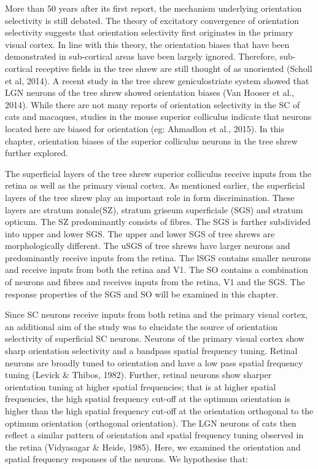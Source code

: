 \documentclass [12pt]{report}
\begin{document}
More than 50 years after its first report, the mechanism underlying orientation selectivity is still debated. The theory of excitatory convergence of orientation selectivity suggests that orientation selectivity first originates in the primary visual cortex. In line with this theory, the orientation biases that have been demonstrated in sub-cortical areas have been largely ignored. Therefore, sub-cortical receptive fields in the tree shrew are still thought of as unoriented (Scholl et al, 2014). A recent study in the tree shrew geniculostriate system showed that LGN neurons of the tree shrew showed orientation biases (Van Hooser et al., 2014). While there are not many reports of orientation selectivity in the SC of cats and macaques, studies in the mouse superior colliculus indicate that neurons located here are biased for orientation (eg: Ahmadlou et al., 2015). In this chapter, orientation biases of the superior colliculus neurons in the tree shrew further explored.

The superficial layers of the tree shrew superior colliculus receive inputs from the retina as well as the primary visual cortex. As mentioned earlier, the superficial layers of the tree shrew play an important role in form discrimination. These layers are stratum zonale(SZ), stratum griseum superficiale (SGS) and stratum opticum. The SZ predominantly consists of fibres. The SGS is further subdivided into upper and lower SGS. The upper and lower SGS of tree shrews are morphologically different. The uSGS of tree shrews have larger neurons and predominantly receive inputs from the retina. The lSGS contains smaller neurons and receive inputs from both the retina and V1. The SO contains a combination of neurons and fibres and receives inputs from the retina, V1 and the SGS. The response properties of the SGS and SO will be examined in this chapter.

Since SC neurons receive inputs from both retina and the primary visual cortex, an additional aim of the study was to elucidate the source of orientation selectivity of superficial SC neurons. Neurons of the primary visual cortex show sharp orientation selectivity and a bandpass spatial frequency tuning. Retinal neurons are broadly tuned to orientation and have a low pass spatial frequency tuning (Levick \& Thibos, 1982). Further, retinal neurons show sharper orientation tuning at higher spatial frequencies; that is at higher spatial frequencies, the high spatial frequency cut-off at the optimum orientation is higher than the high spatial frequency cut-off at the orientation orthogonal to the optimum orientation (orthogonal orientation). The LGN neurons of cats then reflect a similar pattern of orientation and spatial frequency tuning observed in the retina (Vidyasagar \& Heide, 1985). Here, we examined the orientation and spatial frequency responses of the neurons. We hypothesise that:
\end{document}
